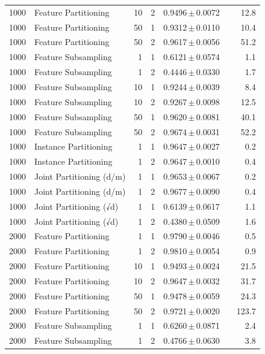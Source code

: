 \begin{table}[ht]
\begin{tabular}{rlrrccr}
1000 & Feature Partitioning & 10 & 2 & 0.9496\,$\pm$\,0.0072 &  & 12.8 \\
1000 & Feature Partitioning & 50 & 1 & 0.9312\,$\pm$\,0.0110 &  & 10.4 \\
1000 & Feature Partitioning & 50 & 2 & 0.9617\,$\pm$\,0.0056 &  & 51.2 \\
1000 & Feature Subsampling & 1 & 1 & 0.6121\,$\pm$\,0.0574 &  & 1.1 \\
1000 & Feature Subsampling & 1 & 2 & 0.4446\,$\pm$\,0.0330 &  & 1.7 \\
1000 & Feature Subsampling & 10 & 1 & 0.9244\,$\pm$\,0.0039 &  & 8.4 \\
1000 & Feature Subsampling & 10 & 2 & 0.9267\,$\pm$\,0.0098 &  & 12.5 \\
1000 & Feature Subsampling & 50 & 1 & 0.9620\,$\pm$\,0.0081 &  & 40.1 \\
1000 & Feature Subsampling & 50 & 2 & 0.9674\,$\pm$\,0.0031 &  & 52.2 \\
1000 & Instance Partitioning & 1 & 1 & 0.9647\,$\pm$\,0.0027 &  & 0.2 \\
1000 & Instance Partitioning & 1 & 2 & 0.9647\,$\pm$\,0.0010 &  & 0.4 \\
1000 & Joint Partitioning (d/m) & 1 & 1 & 0.9653\,$\pm$\,0.0067 &  & 0.2 \\
1000 & Joint Partitioning (d/m) & 1 & 2 & 0.9677\,$\pm$\,0.0090 &  & 0.4 \\
1000 & Joint Partitioning (√d) & 1 & 1 & 0.6139\,$\pm$\,0.0617 &  & 1.1 \\
1000 & Joint Partitioning (√d) & 1 & 2 & 0.4380\,$\pm$\,0.0509 &  & 1.6 \\
2000 & Feature Partitioning & 1 & 1 & 0.9790\,$\pm$\,0.0046 &  & 0.5 \\
2000 & Feature Partitioning & 1 & 2 & 0.9810\,$\pm$\,0.0054 &  & 0.9 \\
2000 & Feature Partitioning & 10 & 1 & 0.9493\,$\pm$\,0.0024 &  & 21.5 \\
2000 & Feature Partitioning & 10 & 2 & 0.9647\,$\pm$\,0.0032 &  & 31.7 \\
2000 & Feature Partitioning & 50 & 1 & 0.9478\,$\pm$\,0.0059 &  & 24.3 \\
2000 & Feature Partitioning & 50 & 2 & 0.9721\,$\pm$\,0.0020 &  & 123.7 \\
2000 & Feature Subsampling & 1 & 1 & 0.6260\,$\pm$\,0.0871 &  & 2.4 \\
2000 & Feature Subsampling & 1 & 2 & 0.4766\,$\pm$\,0.0630 &  & 3.8 \\

\end{tabular}
\end{table}
